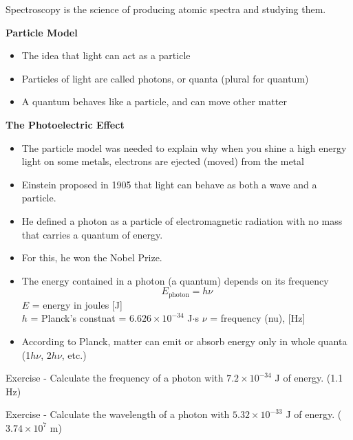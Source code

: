 \documentclass[../hchem.tex]{subfiles}
\begin{document}
Spectroscopy is the science of producing atomic spectra and studying them.

\textbf{Particle Model}
\begin{itemize}
    \item The idea that light can act as a particle 
    \item Particles of light are called photons, or quanta (plural for quantum)
    \item A quantum behaves like a particle, and can move other matter 
\end{itemize}

\textbf{The Photoelectric Effect}
\begin{itemize}
    \item The particle model was needed to explain why when you shine a high energy light on some metals, electrons are ejected (moved) from the metal 
\end{itemize}

\begin{itemize}
    \item Einstein proposed in 1905 that light can behave as both a wave and a particle.
    \item He defined a photon as a particle of electromagnetic radiation with no mass that carries a quantum of energy.
    \item For this, he won the Nobel Prize.
\end{itemize}

\begin{itemize}
    \item The energy contained in a photon (a quantum) depends on its frequency 
    \[E_{\text{photon}}=h\nu\]
    $E$ = energy in joules [J]\\
    $h$ = Planck's constnat = $6.626\times 10^{-34}$ J$\cdot$s 
    $\nu$ = frequency (nu), [Hz]
    \item According to Planck, matter can emit or absorb energy only in whole quanta (1$h\nu$, 2$h\nu$, etc.)
\end{itemize}

Exercise - Calculate the frequency of a photon with $7.2\times10^{-34}$ J of energy. (1.1 Hz)

Exercise - Calculate the wavelength of a photon with $5.32\times 10^{-33}$ J of energy. ($3.74\times10^7$ m)
\end{document}
